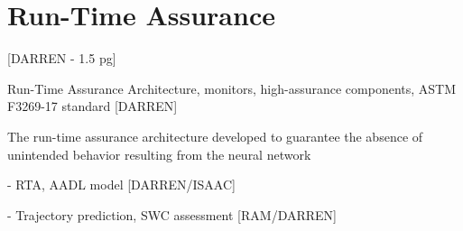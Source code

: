 \section{Run-Time Assurance}

[DARREN - 1.5 pg]

Run-Time Assurance Architecture, monitors, high-assurance components, ASTM F3269-17 standard [DARREN]

The run-time assurance architecture developed to guarantee the absence of unintended behavior resulting from the neural network

- RTA, AADL model [DARREN/ISAAC]

- Trajectory prediction, SWC assessment [RAM/DARREN]
